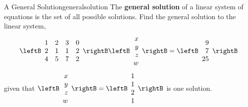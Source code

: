 \begin{example}{A General Solution}{generalsolution}
The \textbf{general solution}  of a linear system of equations 
is the set of
all possible solutions. Find the general solution to the linear system,
\begin{equation*}
\leftB
\begin{array}{rrrr}
1 & 2 & 3 & 0 \\
2 & 1 & 1 & 2 \\
4 & 5 & 7 & 2
\end{array}
\rightB \leftB
\begin{array}{r}
x \\
y \\
z \\
w
\end{array}
\rightB =\leftB
\begin{array}{r}
9 \\
7 \\
25
\end{array}
\rightB
\end{equation*}
given that $\leftB
\begin{array}{r}
x \\
y \\
z \\
w
\end{array}
\rightB=\leftB
\begin{array}{r}
1 \\
1 \\
2 \\
1
\end{array}
\rightB$ is one solution.
\end{example}

